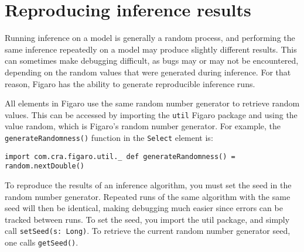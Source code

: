 \section{Reproducing inference results}

Running inference on a model is generally a random process, and performing the same inference repeatedly on a model may produce slightly different results. This can sometimes make debugging difficult, as bugs may or may not be encountered, depending on the random values that were generated during inference. For that reason, Figaro has the ability to generate reproducible inference runs.

All elements in Figaro use the same random number generator to retrieve random values. This can be accessed by importing the \texttt{util} Figaro package and using the value random, which is Figaro's random number generator. For example, the \texttt{generateRandomness()} function in the \texttt{Select} element is:

\begin{flushleft}
\texttt{import com.cra.figaro.util.\_
\newline 
\newline def generateRandomness() = random.nextDouble()
}
\end{flushleft}

To reproduce the results of an inference algorithm, you must set the seed in the random number generator. Repeated runs of the same algorithm with the same seed will then be identical, making debugging much easier since errors can be tracked between runs. To set the seed, you import the util package, and simply call \texttt{setSeed(s: Long)}. To retrieve the current random number generator seed, one calls \texttt{getSeed()}.

